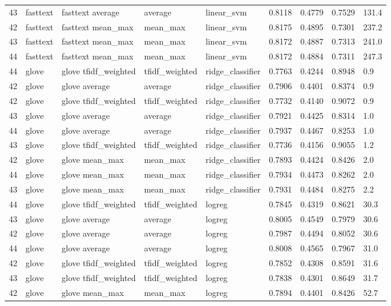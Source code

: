 \begin{table}[htbp]
\begin{tabular}{lllllllll}
43 & fasttext & fasttext average & average & linear\_svm & 0.8118 & 0.4779 & 0.7529 & 131.4 \\
42 & fasttext & fasttext mean\_max & mean\_max & linear\_svm & 0.8175 & 0.4895 & 0.7301 & 237.2 \\
43 & fasttext & fasttext mean\_max & mean\_max & linear\_svm & 0.8172 & 0.4887 & 0.7313 & 241.0 \\
44 & fasttext & fasttext mean\_max & mean\_max & linear\_svm & 0.8172 & 0.4884 & 0.7311 & 247.3 \\
44 & glove & glove tfidf\_weighted & tfidf\_weighted & ridge\_classifier & 0.7763 & 0.4244 & 0.8948 & 0.9 \\
42 & glove & glove average & average & ridge\_classifier & 0.7906 & 0.4401 & 0.8374 & 0.9 \\
42 & glove & glove tfidf\_weighted & tfidf\_weighted & ridge\_classifier & 0.7732 & 0.4140 & 0.9072 & 0.9 \\
43 & glove & glove average & average & ridge\_classifier & 0.7921 & 0.4425 & 0.8314 & 1.0 \\
44 & glove & glove average & average & ridge\_classifier & 0.7937 & 0.4467 & 0.8253 & 1.0 \\
43 & glove & glove tfidf\_weighted & tfidf\_weighted & ridge\_classifier & 0.7736 & 0.4156 & 0.9055 & 1.2 \\
42 & glove & glove mean\_max & mean\_max & ridge\_classifier & 0.7893 & 0.4424 & 0.8426 & 2.0 \\
44 & glove & glove mean\_max & mean\_max & ridge\_classifier & 0.7934 & 0.4473 & 0.8262 & 2.0 \\
43 & glove & glove mean\_max & mean\_max & ridge\_classifier & 0.7931 & 0.4484 & 0.8275 & 2.2 \\
44 & glove & glove tfidf\_weighted & tfidf\_weighted & logreg & 0.7845 & 0.4319 & 0.8621 & 30.3 \\
43 & glove & glove average & average & logreg & 0.8005 & 0.4549 & 0.7979 & 30.6 \\
42 & glove & glove average & average & logreg & 0.7987 & 0.4494 & 0.8052 & 30.6 \\
44 & glove & glove average & average & logreg & 0.8008 & 0.4565 & 0.7967 & 31.0 \\
42 & glove & glove tfidf\_weighted & tfidf\_weighted & logreg & 0.7852 & 0.4308 & 0.8591 & 31.6 \\
43 & glove & glove tfidf\_weighted & tfidf\_weighted & logreg & 0.7838 & 0.4301 & 0.8649 & 31.7 \\
42 & glove & glove mean\_max & mean\_max & logreg & 0.7894 & 0.4401 & 0.8426 & 52.7 \\

\end{tabular}
\end{table}
